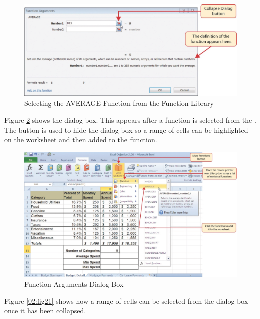 \begin{figure}[H]
	\centering
	\includegraphics[width=\maxwidth{.95\linewidth}]{gfx/ch02_fig19}
	\caption{Selecting the AVERAGE Function from the Function Library}
	\label{02:fig19}
\end{figure}

Figure \ref{02:fig20} shows the  dialog box. This appears after a function is selected from the . The  button is used to hide the dialog box so a range of cells can be highlighted on the worksheet and then added to the function.

\begin{figure}[H]
	\centering
	\includegraphics[width=\maxwidth{.95\linewidth}]{gfx/ch02_fig20}
	\caption{Function Arguments Dialog Box}
	\label{02:fig20}
\end{figure}

Figure \ref{02:fig21} shows how a range of cells can be selected from the  dialog box once it has been collapsed.

